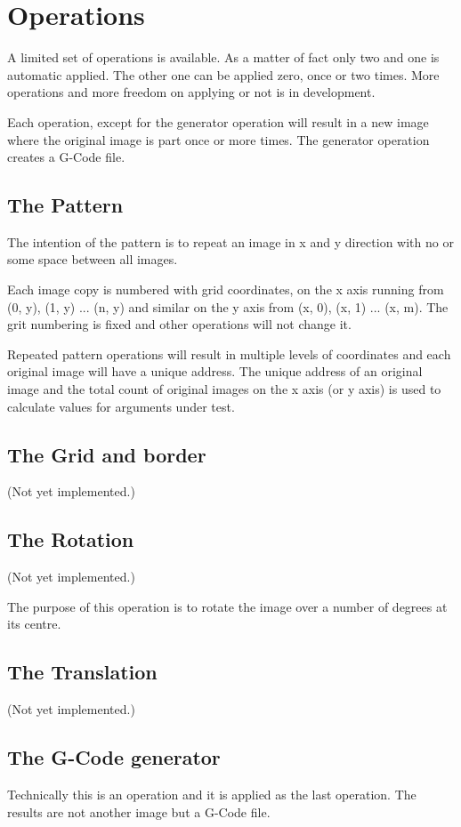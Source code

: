 \section{Operations}
A limited set of operations is available. As a matter of fact only two and one is automatic applied. The other one
can be applied zero, once or two times. More operations and more freedom on applying or not is in development.

Each operation, except for the generator operation will result in a new image where the original
image is part once or more times. The generator operation creates a G-Code file.

\subsection{The Pattern}
The intention of the pattern%
is to repeat an image in x and y
direction with no or some space between all images.

Each image copy is numbered with grid coordinates, on the x axis running from (0, y), (1, y) ... (n, y) and similar
on the y axis from (x, 0), (x, 1) ... (x, m). The grit numbering is fixed and other operations will not change it.

Repeated pattern operations will result in multiple levels of coordinates and each original image
will have a unique address. The unique address of an original image and the total count of original images on
the x axis (or y axis) is used to calculate values for arguments under test.

\subsection{The Grid and border}
(Not yet implemented.)

\subsection{The Rotation}
(Not yet implemented.)

The purpose of this operation is to rotate the image over a number of degrees at its centre.

\subsection{The Translation}
(Not yet implemented.)

\subsection{The G-Code generator}
Technically this is an operation and it is applied as
the last operation. The results are not another image but a G-Code file.

